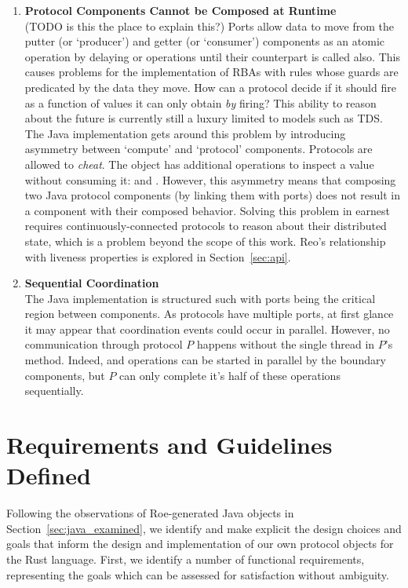 \begin{enumerate}
	\item \textbf{Protocol Components Cannot be Composed at Runtime}\\
	(TODO is this the place to explain this?)
	Ports allow data to move from the putter (or `producer') and getter (or `consumer') components as an atomic operation by delaying  or  operations until their counterpart is called also. This causes problems for the implementation of RBAs with rules whose guards are predicated by the data they move. How can a protocol decide if it should fire as a function of values it can only obtain \textit{by} firing? This ability to reason about the future is currently still a luxury limited to models such as TDS. The Java implementation gets around this problem by introducing asymmetry between `compute' and `protocol' components. Protocols are allowed to \textit{cheat}. The  object has additional operations to inspect a value without consuming it:  and . However, this asymmetry means that composing two Java protocol components (by linking them with ports) does not result in a component with their composed behavior. Solving this problem in earnest requires continuously-connected protocols to reason about their distributed state, which is a problem beyond the scope of this work. Reo's relationship with liveness properties is explored in Section~\ref{sec:api}.
	
	\item \textbf{Sequential Coordination}\\
	The Java implementation is structured such with ports being the critical region between components. As protocols have multiple ports, at first glance it may appear that coordination events could occur in parallel. However, no communication through protocol $P$ happens without the single thread in $P$'s  method. Indeed,  and  operations can be started in parallel by the boundary components, but $P$ can only complete it's half of these operations sequentially.
	
\end{enumerate}

\section{Requirements and Guidelines Defined}
\label{sec:requirements_defined}
Following the observations of Roe-generated Java objects in Section~\ref{sec:java_examined}, we identify and make explicit the design choices and goals that inform the design and implementation of our own protocol objects for the Rust language. 
First, we identify a number of functional requirements, representing the goals which can be assessed for satisfaction without ambiguity.



